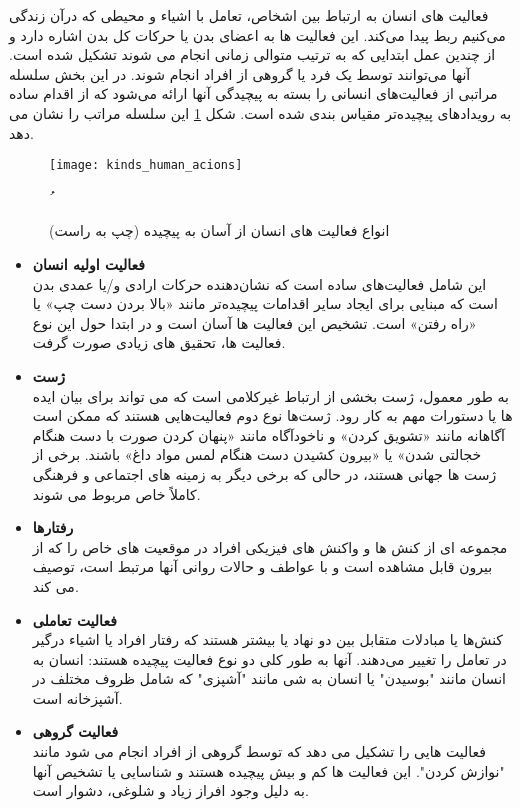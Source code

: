فعالیت های انسان به ارتباط بین اشخاص، تعامل با اشیاء و محیطی که درآن زندگی می‌کنیم ربط پیدا می‌کند. این فعالیت ها به اعضای بدن یا حرکات کل بدن اشاره دارد و از چندین عمل ابتدایی که به ترتیب متوالی زمانی انجام می شوند تشکیل شده است. آنها می‌توانند توسط یک فرد یا گروهی از افراد انجام شوند. در این بخش سلسله مراتبی از فعالیت‌های انسانی را بسته به پیچیدگی آنها ارائه می‌شود که از اقدام ساده به رویدادهای پیچیده‌تر مقیاس بندی شده است. شکل
\ref{fig:kinds_human_acions}
این سلسله مراتب را نشان می دهد.

\vspace{8pt}
\begin{figure}[ht]
	\centerline{\texttt{[image: kinds\_human\_acions]}}
	\caption[انواع فعالیت های انسان از آسان به پیچیده]{انواع فعالیت های انسان از آسان به پیچیده (چپ به راست)
		~\cite{HumanActionReviewMogadame}
	}ُ
	\label{fig:kinds_human_acions}
\end{figure}
\begin{itemize}
	\item \textbf{فعالیت اولیه انسان}\\
این شامل فعالیت‌های ساده است که نشان‌دهنده حرکات ارادی و/یا عمدی بدن است که مبنایی برای ایجاد سایر اقدامات پیچیده‌تر مانند «بالا بردن دست چپ» یا «راه رفتن» است. تشخیص این فعالیت ها آسان است و در ابتدا حول این نوع فعالیت ها،‌ تحقیق های زیادی صورت گرفت.
	
	\item \textbf{ژست}\\
 به طور معمول، ژست بخشی از ارتباط غیرکلامی است که می تواند برای بیان ایده ها یا دستورات مهم به کار رود. ژست‌ها نوع دوم فعالیت‌هایی هستند که ممکن است آگاهانه مانند «تشویق کردن» و ناخودآگاه مانند «پنهان کردن صورت با دست هنگام خجالتی شدن» یا «بیرون کشیدن دست هنگام لمس مواد داغ» باشند. برخی از ژست ها جهانی هستند، در حالی که برخی دیگر به زمینه های اجتماعی و فرهنگی کاملاً خاص مربوط می شوند. 
 
 \vspace{10pt}
	\item \textbf{رفتارها}\\
 مجموعه ای از کنش ها و واکنش های فیزیکی افراد در موقعیت های خاص را که از بیرون قابل مشاهده است و با عواطف و حالات روانی آنها مرتبط است، توصیف می کند.

	\item \textbf{فعالیت تعاملی}\\
کنش‌ها یا مبادلات متقابل بین دو نهاد یا بیشتر هستند که رفتار افراد یا اشیاء درگیر در تعامل را تغییر می‌دهند. آنها به طور کلی دو نوع فعالیت پیچیده هستند: انسان به انسان مانند "بوسیدن" یا انسان به شی مانند "آشپزی" که شامل ظروف مختلف در آشپزخانه است.

	\item \textbf{فعالیت گروهی}\\
 فعالیت هایی را تشکیل می دهد که توسط گروهی از افراد انجام می شود مانند "نوازش کردن". این فعالیت ها کم و بیش پیچیده هستند و شناسایی یا تشخیص آنها به دلیل وجود افراز زیاد و شلوغی، دشوار است. 

\end{itemize}

